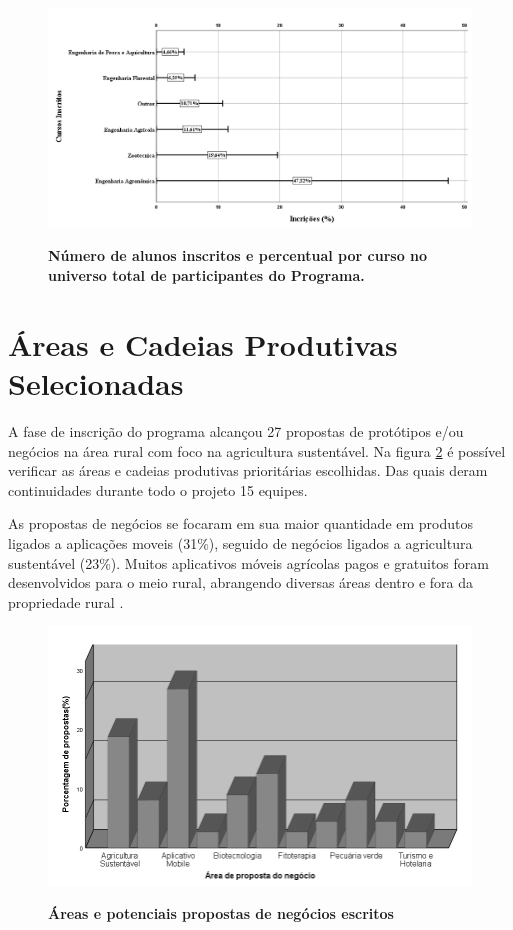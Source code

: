 \begin{figure}[H]
\caption{\textbf{Número de alunos inscritos e percentual por curso no universo total de participantes do Programa.}}
\centering
\includegraphics[scale=0.3]{Imagens/inscritos.png}
\label{figura_10}
\end{figure}

\section{Áreas e Cadeias Produtivas Selecionadas}

A fase de inscrição do programa alcançou 27 propostas de protótipos e/ou negócios na área rural com foco na agricultura sustentável. Na figura \ref{figura_11} é possível verificar as áreas e cadeias produtivas prioritárias escolhidas. Das quais deram continuidades durante todo o projeto 15 equipes.

As propostas de negócios se focaram em sua maior quantidade em produtos ligados a aplicações moveis (31\%), seguido de negócios ligados a agricultura sustentável (23\%). Muitos aplicativos móveis agrícolas pagos e gratuitos foram desenvolvidos para o meio rural, abrangendo diversas áreas dentro e fora da propriedade rural \cite{silva_caracterizacao_2017}. 




\begin{figure}[H]
\centering
\caption{\textbf{Áreas e potenciais propostas de negócios escritos}}
\includegraphics[scale=0.6]{Imagens/propostas_negocios.png}
\label{figura_11}
\end{figure}


